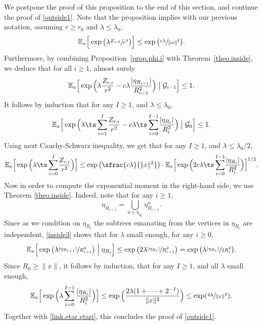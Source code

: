 We postpone the proof of this proposition to the end of this section, and continue the proof of \eqref{outside1}.
Note that the proposition implies with our previous notation, assuming $r\ge r_0$ and $\lambda\le \lambda_0$,
\begin{equation*}
\mathbb E_x\Big[\exp\big(\lambda\sfrac{Z_{r,0}}{r^2}\big)\Big] \le \exp\big(\sfrac{c\lambda}{\|x\|^2}\big).
\end{equation*}
Furthermore, by combining Proposition~\ref{prop.phi.i} with Theorem~\ref{theo.inside}, we deduce that for all $i\ge 1$,
almost surely
\begin{equation*}
\mathbb E_x\Big[\exp\Big(\lambda\frac{Z_{r,i}}{r^2}
- c\lambda\frac{ |\eta_{R_{i-1}}|}{R_{i-1}^2}\Big)\bigm| \mathcal G_{i-1}\Big] \le 1.
\end{equation*}
It follows by induction that for any $I\ge 1$, and $\lambda\le \lambda_0$,
\[
\mathbb E_x\Big[\exp\Big(\lambda{\ts\sum_{i=1}^I} \frac{ Z_{r,i}}{r^2}
-c\lambda {\ts\sum_{i=0}^{I-1}}\frac{ |\eta_{R_i}|}{R_i^2}\Big)
\bigm| \mathcal G_0
\Big] \le 1.
\]
Using next Cauchy-Schwarz inequality, we get that for any $I\ge 1$, and $\lambda\le \lambda_0/2$,
\[
\mathbb E_x\Big[\exp\Big(\lambda {\ts\sum_{i=0}^I}
\frac{ Z_{r,i}}{r^2} \Big)\Big]
\le \exp\big(\sfrac{c\lambda}{\|x\|^2}\big) \cdot
\mathbb E_x\Big[\exp\Big(2c\lambda {\ts\sum_{i=0}^{I-1}}
\frac{ |\eta_{R_i}|}{R_i^2}\Big)\Big]^{1/2}.
\]
Now in order to compute the exponential moment in the right-hand side,
we use Theorem \ref{theo.inside}. Indeed, note that for any $i\ge 1$,
\begin{equation*}
\eta_{R_{i+1}} = \bigcup_{u\in \eta_{R_i}}
\eta^u_{R_{i+1}}.
\end{equation*}
Since as we condition on $ \eta_{R_i}$ the subtrees emanating from the vertices in
$\eta_{R_i}$ are independent,
\eqref{inside3} shows that for $\lambda$ small enough, for any $i\ge 0$,
\begin{equation*}
\mathbb E_x\Big[\exp\big(\lambda \sfrac{ |\eta_{R_{i+1}}|}{R_{i+1}^2}\big)
\Bigm|\eta_{R_i}\Big]
\le \exp\big(2\lambda \sfrac{ |\eta_{R_i}|}{R_{i+1}^2}\big)
= \exp\big(\lambda \sfrac{ |\eta_{R_i}|}{2R_i^2}\big).
\end{equation*}
Since $R_0\ge \|x\|$, it follows by induction, that
for any $I\ge 1$, and all $\lambda$ small enough,
\begin{equation*}
\mathbb E_x\Big[\exp\Big(\lambda \sum_{i=0}^{I-1}
\frac{ |\eta_{R_i}|}{R_i^2}\Big)\Big]
\le \exp\Big(\frac{2\lambda(1+\dots+2^{-I})}{\|x\|^2}\Big)
\le \exp(\sfrac{4\lambda}{\|x\|^2}).
\end{equation*}
Together with \eqref{link.etar.etari}, this concludes the proof of \eqref{outside1}.

